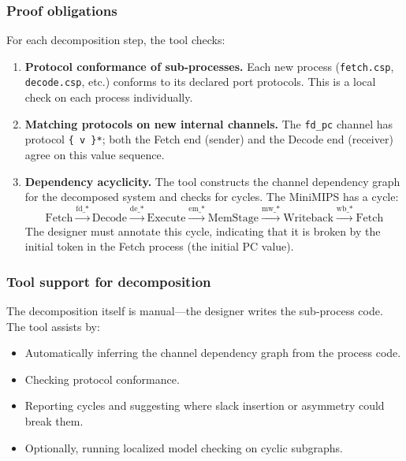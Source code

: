 \documentclass[11pt]{article}
\begin{document}
\subsubsection{Proof obligations}

For each decomposition step, the tool checks:

\begin{enumerate}
\item \textbf{Protocol conformance of sub-processes.}
  Each new process (\texttt{fetch.csp}, \texttt{decode.csp}, etc.)
  conforms to its declared port protocols.  This is a local check on
  each process individually.

\item \textbf{Matching protocols on new internal channels.}
  The \texttt{fd\_pc} channel has protocol \texttt{\{ v \}*}; both
  the Fetch end (sender) and the Decode end (receiver) agree on this
  value sequence.

\item \textbf{Dependency acyclicity.}
  The tool constructs the channel dependency graph for the decomposed
  system and checks for cycles.  The MiniMIPS has a cycle:
  \[
  \text{Fetch} \xrightarrow{\text{fd\_*}} \text{Decode}
  \xrightarrow{\text{de\_*}} \text{Execute}
  \xrightarrow{\text{em\_*}} \text{MemStage}
  \xrightarrow{\text{mw\_*}} \text{Writeback}
  \xrightarrow{\text{wb\_*}} \text{Fetch}
  \]
  The designer must annotate this cycle, indicating that it is broken
  by the initial token in the Fetch process (the initial PC value).
\end{enumerate}

\subsubsection{Tool support for decomposition}

The decomposition itself is manual---the designer writes the sub-process
code.  The tool assists by:
\begin{itemize}
\item Automatically inferring the channel dependency graph from the
  process code.
\item Checking protocol conformance.
\item Reporting cycles and suggesting where slack insertion or
  asymmetry could break them.
\item Optionally, running localized model checking on cyclic
  subgraphs.
\end{itemize}
\end{document}
